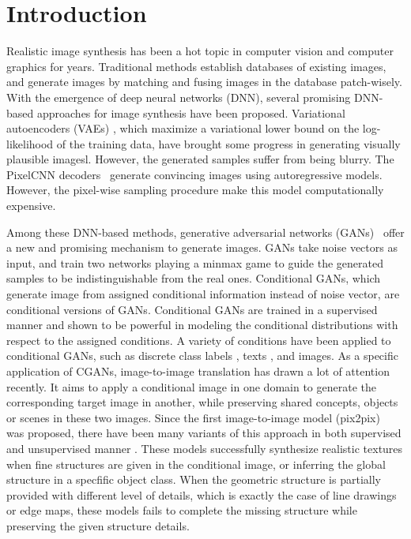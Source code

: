\section{Introduction}
Realistic image synthesis has been a hot topic in computer vision and computer graphics for years. 
Traditional methods \cite{EBSR, TextureSyn,SceneCompletion} establish databases of existing images, and generate images by matching and fusing images in the database patch-wisely. 
With the emergence of deep neural networks (DNN), several promising DNN-based approaches for image synthesis have been proposed. 
Variational autoencoders (VAEs) \cite{VAEs}, which maximize a variational lower bound on the log-likelihood of the training data, have brought some progress in generating visually plausible imagesl. However, the generated samples suffer from being blurry. 
The PixelCNN decoders~\cite{PixelCNN} generate convincing images using autoregressive models. However, the pixel-wise sampling procedure make this model computationally expensive.
%

Among these DNN-based methods, generative adversarial networks (GANs)~\cite{GANs} offer a new and promising mechanism to generate images.
GANs take noise vectors as input, and train two networks playing a minmax game to guide the generated samples to be indistinguishable from the real ones. 
Conditional GANs, which generate image from assigned conditional information instead of noise vector, are conditional versions of GANs. 
Conditional GANs are trained in a supervised manner and shown to be powerful in modeling the conditional distributions with respect to the assigned conditions. 
A variety of conditions have been applied to conditional GANs, such as discrete class labels \cite{cGANs}, texts \cite{StackGANs, StackGANs++}, and images.
%
As a specific application of CGANs, image-to-image translation has drawn a lot of attention recently.
It aims to apply a conditional image in one domain to generate the corresponding target image in another, while preserving shared concepts, objects or scenes in these two images. 
Since the first image-to-image model (pix2pix)~\cite{pix2pix} was proposed, there have been many variants of this approach in both supervised and unsupervised manner \cite{CycleGANs, DualGANs,CoupleGANs,BicycleGANs}. %
These models successfully synthesize realistic textures when fine structures are given in the conditional image, or inferring the global structure in a specfific object class. When the geometric structure is partially provided with different level of details, which is exactly the case of line drawings or edge maps, these models fails to complete the missing structure while preserving the given structure details.

